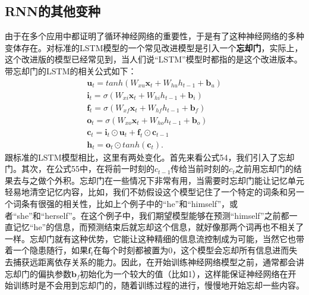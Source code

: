 \documentclass[10pt,a4paper]{ctexart}
\begin{document}
\subsection{RNN的其他变种}
由于在多个应用中都证明了循环神经网络的重要性，于是有了这种神经网络的多种变体存在。对标准的LSTM模型的一个常见改进模型是引入一个\textbf{忘却门}\cite{gers2000learning}，实际上，这个改进版的模型已经常见到，当人们说“LSTM”模型时都指的是这个改进版本。带忘却门的LSTM的相关公式如下：
\[
 \begin{array}{l}
 \textbf{u}_t = tanh(W_{xu}\textbf{x}_t + W_{hu}h_{t-1} + \textbf{b}_u) \\
 \textbf{i}_t = \sigma (W_{xi}\textbf{x}_t + W_{hi}h_{t-1} + \textbf{b}_i) \\
 \textbf{f}_t = \sigma (W_{xf}\textbf{x}_t + W_{hf}h_{t-1} + \textbf{b}_f) \\
 \textbf{o}_t = \sigma (W_{xo}\textbf{x}_t + W_{ho}h_{t-1} + \textbf{b}_o) \\
 \textbf{c}_t = \textbf{i}_t \odot \textbf{u}_t + \textbf{f}_t \odot \textbf{c}_{t-1} \\
 \textbf{h}_t = \textbf{o}_t \odot tanh(\textbf{c}_t).
 \end{array}
\]
跟标准的LSTM模型相比，这里有两处变化。首先来看公式54，我们引入了忘却门。其次，在公式55中，在将前一时刻的$c_{t-1}$传给当前时刻的$c_t$之前用忘却门的结果去与之做个外积。忘却门在一些情况下非常有用，当需要时忘却门能让记忆单元轻易地清空记忆内容，比如，我们不妨假设这个模型记住了一个特定的词条和另一个词条有很强的相关性，比如上个例子中的“he”和“himself”，或者“she”和“herself”。在这个例子中，我们期望模型能够在预测“himself”之前都一直记忆“he”的信息，而预测结束后就忘却这个信息，就好像那两个词再也不相关了一样。忘却门就有这种优势，它能让这种精细的信息流控制成为可能，当然它也带着一个隐患随行，如果$\textbf{f}_t$在每个时刻都被置为0，这个模型会忘却所有信息进而失去捕获远距离依存关系的能力。因此，在开始训练神经网络模型之前，通常都会讲忘却门的偏执参数$\textbf{b}_f$初始化为一个较大的值（比如1），这样能保证神经网络在开始训练时是不会用到忘却门的，随着训练过程的进行，慢慢地开始忘却一些内容。
\end{document}
